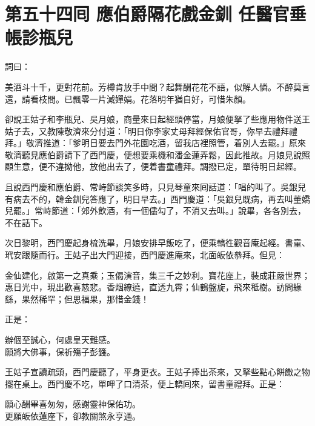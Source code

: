 
\chapter*{第五十四囘 應伯爵隔花戲金釧 任醫官垂帳診瓶兒}


詞曰：

\begin{myquote}
美酒斗十千，更對花前。芳樽肯放手中間？起舞酬花花不語，似解人憐。不醉莫言還，請看枝間。已飄零一片減嬋娟。花落明年猶自好，可惜朱顏。

\end{myquote}

卻說王姑子和李瓶兒、吳月娘，商量來日起經頭停當，月娘便拏了些應用物件送王姑子去，又教陳敬濟來分付道：「明日你李家丈母拜經保佑官哥，你早去禮拜禮拜。」敬濟推道：「爹明日要去門外花園吃酒，留我店裡照管，着別人去罷。」原來敬濟聽見應伯爵請下了西門慶，便想要乘機和潘金蓮弄鬆，因此推故。月娘見說照顧生意，便不違拗他，放他出去了，便着書童禮拜。調撥已定，單待明日起經。

且說西門慶和應伯爵、常峙節談笑多時，只見琴童來囘話道：「唱的叫了。吳銀兒有病去不的，韓金釧兒答應了，明日早去。」西門慶道：「吳銀兒既病，再去叫董嬌兒罷。」常峙節道：「郊外飲酒，有一個儘勾了，不消又去叫。」說畢，各各別去，不在話下。

次日黎明，西門慶起身梳洗畢，月娘安排早飯吃了，便乘轎徃觀音庵起經。書童、玳安跟隨而行。王姑子出大門迎接，西門慶進庵來，北面皈依叅拜。但見：

\begin{myquote}
金仙建化，啟第一之真乘；玉偈演音，集三千之妙利。寶花座上，裝成莊嚴世界；惠日光中，現出歡喜慈悲。香烟繚遶，直透九霄；仙鶴盤旋，飛來秪樹。訪問緣繇，果然稀罕；但思福果，那惜金錢！
\end{myquote}

正是：

\begin{myquote}
辦個至誠心，何處皇天難感。\\願將大佛事，保祈殤子彭籛。
\end{myquote}

王姑子宣讀疏頭，西門慶聽了，平身更衣。王姑子捧出茶來，又拏些點心餅饊之物擺在桌上。西門慶不吃，單呷了口清茶，便上轎囘來，留書童禮拜。正是：

\begin{myquote}
願心酬畢喜匆匆，感謝靈神保佑功。\\更願皈依蓮座下，卻教關煞永亨通。
\end{myquote}

